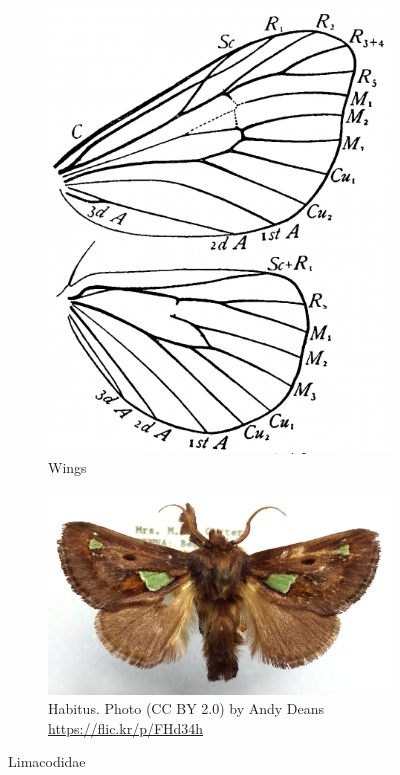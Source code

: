 \documentclass[letterpaper, 11pt]{article}
\begin{document}
\begin{figure}[ht!]
    \centering
    \begin{subfigure}[ht!]{0.3\textwidth}
        \includegraphics[width=\textwidth]{LimacodidWings}
        \caption{Wings \citep[Fig. 349]{comstock1918wings}}
        \label{fig:limacodid1}
    \end{subfigure}
    \hfill %
    \begin{subfigure}[ht!]{0.55\textwidth}
        \includegraphics[width=\textwidth]{LimacodidHabitus}
        \caption{Habitus. Photo (CC BY 2.0) by Andy Deans \url{https://flic.kr/p/FHd34h}}
        \label{fig:limacodid2}
    \end{subfigure}
    \caption{Limacodidae}\label{fig:limacodids}
\end{figure}
\end{document}
